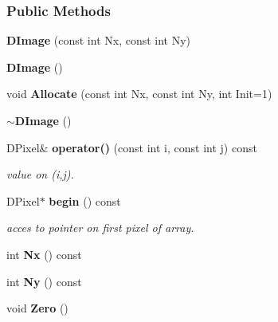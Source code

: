 \subsubsection*{Public Methods}
\begin{CompactItemize}
\item 
{}
{\bf DImage} (const int Nx, const int Ny)\label{class_dimage_a0}

\item 
{}
{\bf DImage} ()\label{class_dimage_a1}

\item 
{}
void {\bf Allocate} (const int Nx, const int Ny, int Init=1)\label{class_dimage_a2}

\item 
{}
{\bf $\sim$DImage} ()\label{class_dimage_a3}

\item 
{}
DPixel\& {\bf operator()} (const int i, const int j) const\label{class_dimage_a4}

\begin{CompactList}\small\item\em value on (i,j).\item\end{CompactList}\item 
{}
DPixel$\ast$ {\bf begin} () const\label{class_dimage_a5}

\begin{CompactList}\small\item\em acces to pointer on first pixel of array.\item\end{CompactList}\item 
{}
int {\bf Nx} () const\label{class_dimage_a6}

\item 
{}
int {\bf Ny} () const\label{class_dimage_a7}

\item 
{}
void {\bf Zero} ()\label{class_dimage_a8}


\end{CompactItemize}
